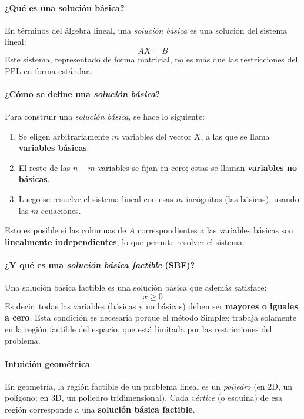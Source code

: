 \paragraph{¿Qué es una solución básica?}

En términos del álgebra lineal, una \textit{solución básica} es una solución del sistema lineal:
\[
AX = B
\]
Este sistema, representado de forma matricial, no es más que las restricciones del PPL en forma estándar.

\paragraph{¿Cómo se define una \textit{solución básica}?}

Para construir una \textit{solución básica}, se hace lo siguiente:
\begin{enumerate}
  \item Se eligen arbitrariamente \(m\) variables del vector \(X\), a las que se llama \textbf{variables básicas}.
  \item El resto de las \(n - m\) variables se fijan en cero; estas se llaman \textbf{variables no básicas}.
  \item Luego se resuelve el sistema lineal con esas \(m\) incógnitas (las básicas), usando las \(m\) ecuaciones.
\end{enumerate}
Esto es posible si las columnas de \(A\) correspondientes a las variables básicas son \textbf{linealmente independientes}, lo que permite resolver el sistema.

\paragraph{¿Y qué es una \textit{solución básica factible} (SBF)?}

Una solución básica factible es una solución básica que además satisface:
\[
x \geq 0
\]
Es decir, todas las variables (básicas y no básicas) deben ser \textbf{mayores o iguales a cero}. Esta condición es necesaria porque el método Simplex trabaja solamente en la región factible del espacio, que está limitada por las restricciones del problema.

\paragraph{Intuición geométrica}

En geometría, la región factible de un problema lineal es un \textit{poliedro} (en 2D, un polígono; en 3D, un poliedro tridimensional). Cada \textit{vértice} (o esquina) de esa región corresponde a una \textbf{solución básica factible}.

